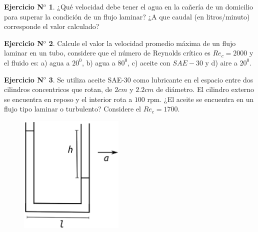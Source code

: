 \documentclass[11pt,a4paper]{article}
\theoremstyle{definition}
\newtheorem{theorem}{Ejercicio N$^o$}
\begin{document}
\begin{theorem}
¿Qué velocidad debe tener el agua en la cañería de un domicilio para superar la condición de un flujo laminar? ¿A que caudal (en litros/minuto) corresponde el valor calculado?
\end{theorem}


\begin{theorem}
Calcule el valor la velocidad promedio máxima de un flujo laminar en un tubo, considere que el número de Reynolds crítico es $Re_c=2000$ y el fluido es: a) agua a $20^0$, b) agua a $80^0$, c) aceite con $SAE-30$ y d) aire a $20^0$.
\end{theorem}

\begin{theorem}
Se utiliza aceite SAE-30 como lubricante en el espacio entre dos cilindros concentricos que rotan, de $2cm$ y $2.2 cm$ de diámetro. El cilindro externo se encuentra en reposo y el interior rota a $100$ rpm. ¿El aceite se encuentra en un flujo tipo laminar o turbulento? Considere el $Re_c=1700$.
\end{theorem}




\begin{figure}
\begin{center}
\includegraphics[width=5cm]{TuboU}
\caption{}
\label{figTuboU}
\end{center}
\end{figure}
\end{document}
